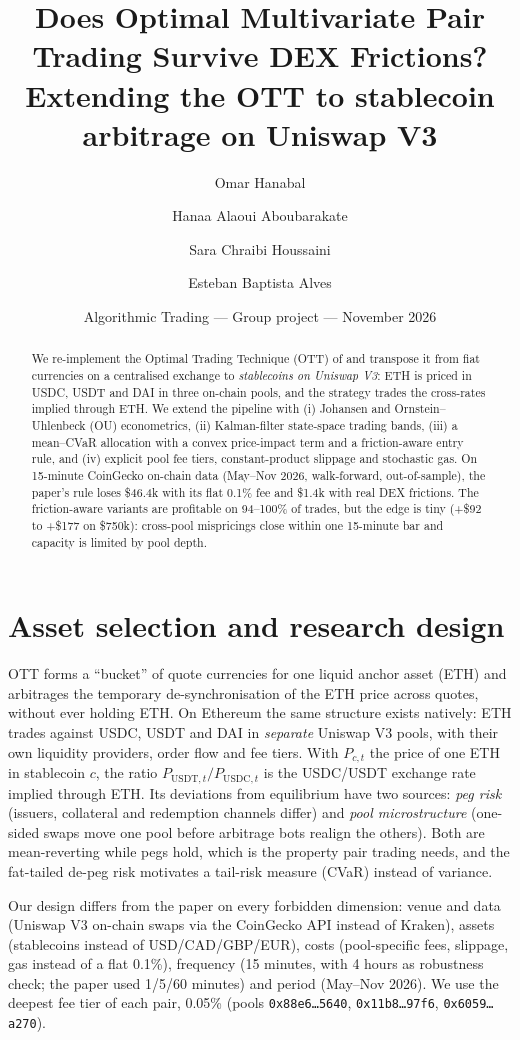 \documentclass[10pt,a4paper]{article}
\title{\vspace{-1.2cm}\textbf{Does Optimal Multivariate Pair Trading Survive DEX Frictions?}\\[2pt]
\large Extending the OTT to stablecoin arbitrage on Uniswap V3}
\author{Omar Hanabal \and Hanaa Alaoui Aboubarakate \and Sara Chraibi Houssaini \and Esteban Baptista Alves}
\date{\vspace{-0.3cm}\small Algorithmic Trading --- Group project --- November 2026}
\begin{document}
\maketitle
\vspace{-0.4cm}
\begin{abstract}\noindent
We re-implement the Optimal Trading Technique (OTT) of \citet{yang2024} and transpose it from fiat currencies on a centralised exchange to \emph{stablecoins on Uniswap V3}: ETH is priced in USDC, USDT and DAI in three on-chain pools, and the strategy trades the cross-rates implied through ETH. We extend the pipeline with (i) Johansen and Ornstein--Uhlenbeck (OU) econometrics, (ii) Kalman-filter state-space trading bands, (iii) a mean--CVaR allocation with a convex price-impact term and a friction-aware entry rule, and (iv) explicit pool fee tiers, constant-product slippage and stochastic gas. On 15-minute CoinGecko on-chain data (May--Nov 2026, walk-forward, out-of-sample), the paper's rule loses \$46.4k with its flat 0.1\% fee and \$1.4k with real DEX frictions. The friction-aware variants are profitable on 94--100\% of trades, but the edge is tiny (+\$92 to +\$177 on \$750k): cross-pool mispricings close within one 15-minute bar and capacity is limited by pool depth.
\end{abstract}

\section{Asset selection and research design}
OTT forms a ``bucket'' of quote currencies for one liquid anchor asset (ETH) and arbitrages the temporary de-synchronisation of the ETH price across quotes, without ever holding ETH. On Ethereum the same structure exists natively: ETH trades against USDC, USDT and DAI in \emph{separate} Uniswap V3 pools, with their own liquidity providers, order flow and fee tiers. With $P_{c,t}$ the price of one ETH in stablecoin $c$, the ratio $P_{\text{USDT},t}/P_{\text{USDC},t}$ is the USDC/USDT exchange rate implied through ETH. Its deviations from equilibrium have two sources: \emph{peg risk} (issuers, collateral and redemption channels differ) and \emph{pool microstructure} (one-sided swaps move one pool before arbitrage bots realign the others). Both are mean-reverting while pegs hold, which is the property pair trading needs, and the fat-tailed de-peg risk motivates a tail-risk measure (CVaR) instead of variance.

Our design differs from the paper on every forbidden dimension: venue and data (Uniswap V3 on-chain swaps via the CoinGecko API instead of Kraken), assets (stablecoins instead of USD/CAD/GBP/EUR), costs (pool-specific fees, slippage, gas instead of a flat 0.1\%), frequency (15 minutes, with 4 hours as robustness check; the paper used 1/5/60 minutes) and period (May--Nov 2026). We use the deepest fee tier of each pair, 0.05\% (pools \texttt{0x88e6\ldots5640}, \texttt{0x11b8\ldots97f6}, \texttt{0x6059\ldots a270}).
\end{document}
